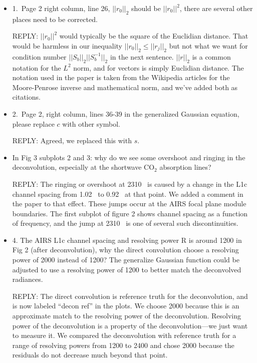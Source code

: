 \documentclass[11pt]{article}
\newcommand {\reply} {\mbox{\small REPLY}}
\begin{document}
\begin{itemize}
  \item 1.~Page 2 right column, line 26, $||r_0||_2$ should be
    $||r_0||^2$, there are several other places need to be
    corrected.

    \reply: $||r_0||^2$ would typically be the square of the
    Euclidian distance.  That would be harmless in our inequality
    $||r_0||_2 \le ||r_j||_2$ but not what we want for condition
    number $||S_b||_2||S_b^{-1}||_2$ in the next sentence.
    $||r||_2$ is a common notation for the $L^2$ norm, and for
    vectors is simply Euclidian distance.  The notation used in the
    paper is taken from the Wikipedia articles for the Moore-Penrose
    inverse and mathematical norm, and we've added both as
    citations.


  \item 2.~Page 2, right column, lines 36-39 in the generalized
    Gaussian equation, please replace $c$ with other symbol.

    \reply: Agreed, we replaced this with $s$.

  \item In Fig 3 subplots 2 and 3: why do we see some overshoot
    and ringing in the deconvolution, especially at the shortwave
    CO$_2$ absorption lines?

    \reply: The ringing or overshoot at 2310~{\wn} is caused by a
    change in the L1c channel spacing from 1.02~{\wn} to 0.92~{\wn}
    at that point.  We added a comment in the paper to that effect.
    These jumps occur at the AIRS focal plane module boundaries.
    The first subplot of figure 2 shows channel spacing as a
    function of frequency, and the jump at 2310~{\wn} is one of
    several such discontinuities.  

  \item 4. The AIRS L1c channel spacing and resolving power R is
    around 1200 in Fig 2 (after deconvolution), why the direct
    convolution choose a resolving power of 2000 instead of 1200?
    The generalize Gaussian function could be adjusted to use a
    resolving power of 1200 to better match the deconvolved
    radiances.

    \reply: The direct convolution is reference truth for the
    deconvolution, and is now labeled ``decon ref'' in the plots.
    We choose 2000 because this is an approximate match to the
    resolving power of the deconvolution.  Resolving power of the
    deconvolution is a property of the deconvolution---we just want
    to measure it.  We compared the deconvolution with reference
    truth for a range of resolving powers from 1200 to 2400 and
    chose 2000 because the residuals do not decrease much beyond
    that point.


\end{itemize}
\end{document}
